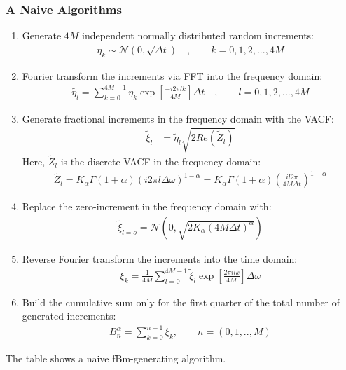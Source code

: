 \documentclass[
  a4paper,BCOR10mm,twoside,
  headsepline,footsepline,%
  fleqn,openbib
]{scrbook}
\begin{document}
\subsubsection{A Naive Algorithms}
\begin{table}
\begin{framed}
\begin{enumerate}
 \item Generate $4M$ independent normally distributed random increments: 
\begin{align}
 \eta_k \sim \mathcal{N}(0,\sqrt{\Delta t})\quad, \qquad k=0,1,2,...,4M 
\end{align}
\item Fourier transform the increments via FFT into the frequency domain:
\begin{align}
 \tilde{\eta_l}=\sum_{k=0}^{4M-1} \eta_k \exp\left[\frac{- i 2 \pi  l k }{4M}\right] \Delta t \quad , \qquad  l=0,1,2,...,4M  \label{eq:fouriertrans}
\end{align}

\item Generate fractional increments in the frequency domain with the VACF: 
 \begin{align}
   \tilde{\xi}_{l}&= \tilde{\eta}_l\sqrt{2 Re( \tilde{Z}_l)} \label{eq:problem} 
  \end{align}
 Here,  $ \tilde{Z}_l$ is the discrete VACF in the frequency domain:
  \begin{align}
   \tilde{Z}_l = K_{\alpha} \Gamma(1+\alpha)(i 2 \pi l \Delta \omega)^{1-\alpha} =  K_{\alpha} \Gamma(1+\alpha)\left( \frac{i l 2 \pi}{4 M \Delta t}\right)^{1-\alpha} 
 \end{align}
 
 \item Replace the zero-increment in the frequency domain with:
\begin{align}
 \tilde{\xi}_{l=o} = \mathcal{N}(0,\sqrt{2 K_{\alpha} (4 M \Delta t)^\alpha})
\end{align}
 \item Reverse Fourier transform the increments into the time domain:
 \begin{align}
 \xi_{k}= \frac{1}{4M} \sum_{l=0}^{4M-1}  \tilde{\xi}_l \exp\left[\frac{2 \pi i l k }{4M}\right] \Delta \omega
 \end{align}
 \item Build the cumulative sum only for the first quarter of the total number of generated increments: 
 \begin{align}
   B^{\alpha}_n= \sum^{n-1}_{k=0} \xi_k ,\qquad n=(0,1,..,M)
  \end{align}
\end{enumerate}
\end{framed}
\caption{The table shows a naive fBm-generating algorithm.}
\label{naivealgorithm}
 \end{table}
\end{document}
